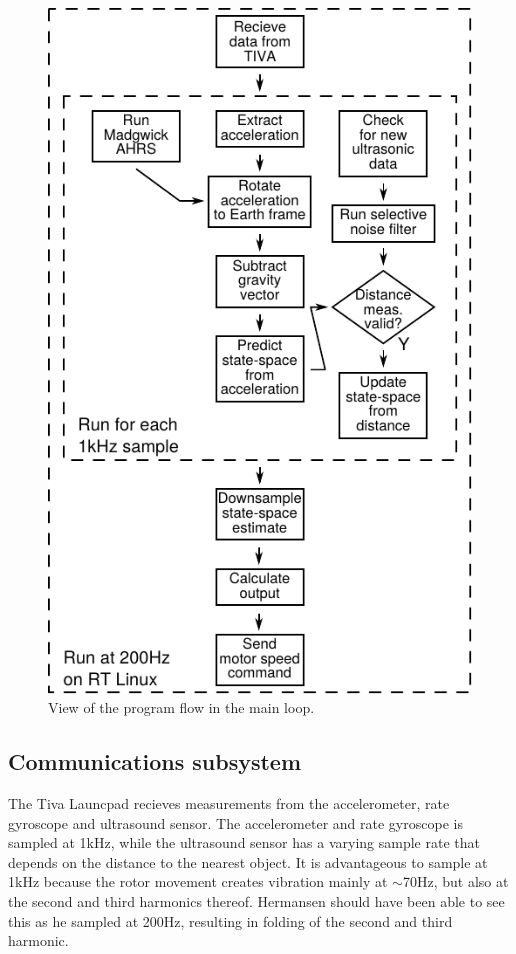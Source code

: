 \begin{figure}
	\centering
	\includegraphics[width=\columnwidth]{pictures/process}
	\caption{View of the program flow in the main loop.} 
	\label{fig:controlflow}
\end{figure}

\subsection{Communications subsystem}\label{sec:comms}
The Tiva Launcpad recieves measurements from the accelerometer, rate gyroscope and ultrasound sensor. The accelerometer and 
rate gyroscope is sampled at 1kHz, while the ultrasound sensor has a varying sample rate that depends on the distance to the nearest
object.
It is advantageous to sample at 1kHz because the rotor movement creates
vibration mainly at \(\sim\)70Hz, but also at the second and third harmonics thereof.
Hermansen should have been able to see this as he sampled at 200Hz, resulting in folding of the second and third
harmonic.


